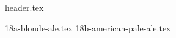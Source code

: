 \clearpage
{}
\divisorLine
{header.tex}
\begin{multicols}{2}
{18a-blonde-ale.tex}
{18b-american-pale-ale.tex}
\end{multicols}